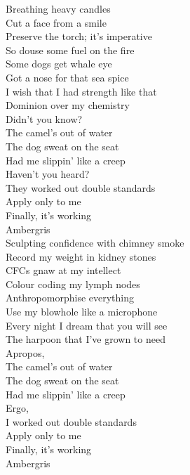 


Breathing heavy candles\\
Cut a face from a smile\\
Preserve the torch; it's imperative\\
So douse some fuel on the fire\\

Some dogs get whale eye\\
Got a nose for that sea spice\\
I wish that I had strength like that\\
Dominion over my chemistry\\

Didn't you know?\\
The camel's out of water\\
The dog sweat on the seat\\
Had me slippin' like a creep\\

Haven't you heard?\\
They worked out double standards\\
Apply only to me\\
Finally, it's working\\
Ambergris\\

Sculpting confidence with chimney smoke\\
Record my weight in kidney stones\\
CFCs gnaw at my intellect\\
Colour coding my lymph nodes\\

Anthropomorphise everything\\
Use my blowhole like a microphone\\
Every night I dream that you will see\\
The harpoon that I've grown to need\\

Apropos,\\
The camel's out of water\\
The dog sweat on the seat\\
Had me slippin' like a creep\\

Ergo,\\
I worked out double standards\\
Apply only to me\\
Finally, it's working\\
Ambergris\\

